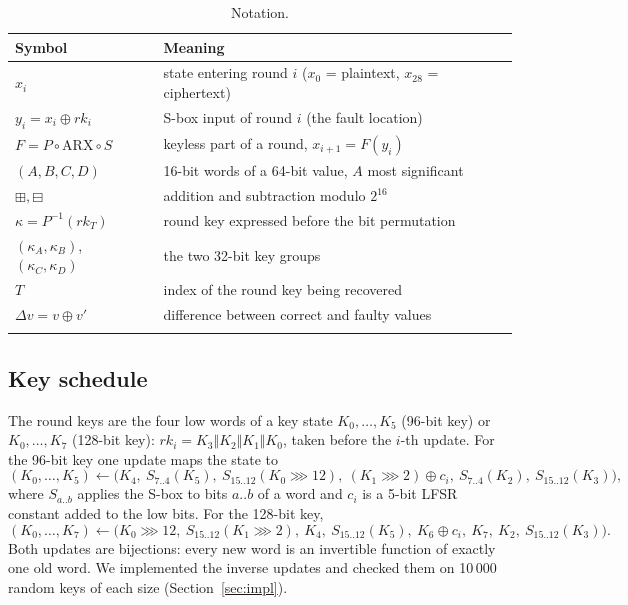 \documentclass[pdflatex,sn-mathphys-num]{sn-jnl}
\theoremstyle{thmstyleone}%
\theoremstyle{thmstylethree}%
\newcommand{\rk}{\mathit{rk}}
\begin{document}
\begin{table}[t]
\caption{Notation.}\label{tab:notation}
\begin{tabular}{@{}ll@{}}
\toprule
Symbol & Meaning\\
\midrule
$x_i$ & state entering round $i$ ($x_0$ = plaintext, $x_{28}$ = ciphertext)\\
$y_i = x_i\oplus\rk_i$ & S-box input of round $i$ (the fault location)\\
$F = P\circ\mathrm{ARX}\circ S$ & keyless part of a round, $x_{i+1} = F(y_i)$\\
$(A,B,C,D)$ & 16-bit words of a 64-bit value, $A$ most significant\\
$\boxplus,\boxminus$ & addition and subtraction modulo $2^{16}$\\
$\kappa = P^{-1}(\rk_T)$ & round key expressed before the bit permutation\\
$(\kappa_A,\kappa_B)$, $(\kappa_C,\kappa_D)$ & the two 32-bit key groups\\
$T$ & index of the round key being recovered\\
$\Delta v = v\oplus v'$ & difference between correct and faulty values\\
\botrule
\end{tabular}
\end{table}

\subsection{Key schedule}

The round keys are the four low words of a key state $K_0,\dots,K_5$ (96-bit key) or
$K_0,\dots,K_7$ (128-bit key): $\rk_i = K_3\Vert K_2\Vert K_1\Vert K_0$, taken before the $i$-th update.
For the 96-bit key one update maps the state to
\begin{equation}\label{eq:ks96}
(K_0,\dots,K_5) \leftarrow \bigl(K_4,\ S_{7..4}(K_5),\ S_{15..12}(K_0\ggg 12),\
(K_1\ggg 2)\oplus c_i,\ S_{7..4}(K_2),\ S_{15..12}(K_3)\bigr),
\end{equation}
where $S_{a..b}$ applies the S-box to bits $a..b$ of a word and $c_i$ is a 5-bit LFSR constant added
to the low bits. For the 128-bit key,
\begin{equation}\label{eq:ks128}
(K_0,\dots,K_7) \leftarrow \bigl(K_0\ggg 12,\ S_{15..12}(K_1\ggg 2),\ K_4,\ S_{15..12}(K_5),\
K_6\oplus c_i,\ K_7,\ K_2,\ S_{15..12}(K_3)\bigr).
\end{equation}
Both updates are bijections: every new word is an invertible function of exactly one old word.
We implemented the inverse updates and checked them on 10\,000 random keys of each size
(Section~\ref{sec:impl}).
\end{document}
